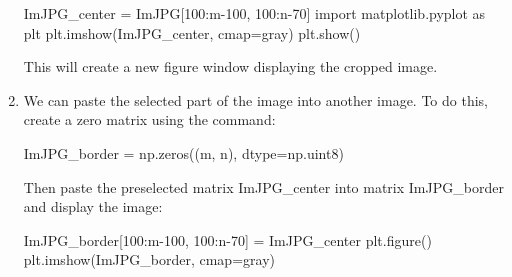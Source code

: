 \documentclass[11pt]{article}
\newenvironment{Shaded}{}{}
\newcommand{\DecValTok}[1]{\textcolor[rgb]{0.25,0.63,0.44}{{#1}}}
\newcommand{\StringTok}[1]{\textcolor[rgb]{0.25,0.44,0.63}{{#1}}}
\newcommand{\NormalTok}[1]{{#1}}
\newcommand{\ImportTok}[1]{{#1}}
\newcommand{\OperatorTok}[1]{\textcolor[rgb]{0.40,0.40,0.40}{{#1}}}
\begin{document}
\begin{enumerate}
\begin{Shaded}
\begin{tcolorbox}[breakable, size=fbox, boxrule=1pt, pad at break*=1mm,colback=cellbackground, colframe=cellborder]
  \begin{Highlighting}[]
\NormalTok{ImJPG\_center }\OperatorTok{=}\NormalTok{ ImJPG[}\DecValTok{100}\NormalTok{:m}\OperatorTok{{-}}\DecValTok{100}\NormalTok{, }\DecValTok{100}\NormalTok{:n}\OperatorTok{{-}}\DecValTok{70}\NormalTok{]}
\ImportTok{import}\NormalTok{ matplotlib.pyplot }\ImportTok{as}\NormalTok{ plt}
\NormalTok{plt.imshow(ImJPG\_center, cmap}\OperatorTok{=}\StringTok{\textquotesingle{}gray\textquotesingle{}}\NormalTok{)}
\NormalTok{plt.show()}
\end{Highlighting}
\end{tcolorbox}
\end{Shaded}

  This will create a new figure window displaying the cropped image.
\item
  We can paste the selected part of the image into another image. To do
  this, create a zero matrix using the command:

\begin{Shaded}
\begin{tcolorbox}[breakable, size=fbox, boxrule=1pt, pad at break*=1mm,colback=cellbackground, colframe=cellborder]
  \begin{Highlighting}[]
\NormalTok{ImJPG\_border }\OperatorTok{=}\NormalTok{ np.zeros((m, n), dtype}\OperatorTok{=}\NormalTok{np.uint8)}
\end{Highlighting}
\end{tcolorbox}
\end{Shaded}

  Then paste the preselected matrix ImJPG\_center into matrix
  ImJPG\_border and display the image:

\begin{Shaded}
\begin{tcolorbox}[breakable, size=fbox, boxrule=1pt, pad at break*=1mm,colback=cellbackground, colframe=cellborder]
  \begin{Highlighting}[]
\NormalTok{ImJPG\_border[}\DecValTok{100}\NormalTok{:m}\OperatorTok{{-}}\DecValTok{100}\NormalTok{, }\DecValTok{100}\NormalTok{:n}\OperatorTok{{-}}\DecValTok{70}\NormalTok{] }\OperatorTok{=}\NormalTok{ ImJPG\_center}
\NormalTok{plt.figure()}
\NormalTok{plt.imshow(ImJPG\_border, cmap}\OperatorTok{=}\StringTok{\textquotesingle{}gray\textquotesingle{}}\NormalTok{)}
\end{Highlighting}
\end{tcolorbox}
\end{Shaded}


\end{enumerate}
\end{document}
